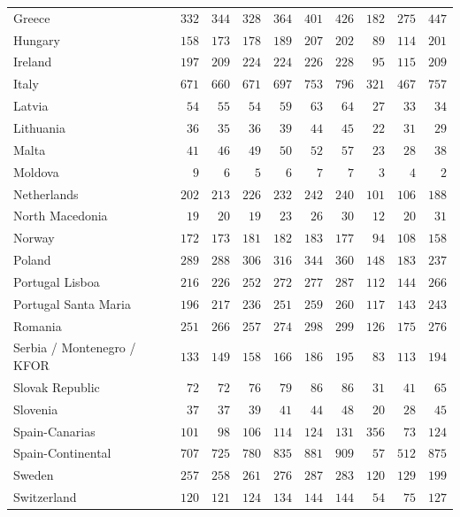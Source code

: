 \documentclass[
  11pt,
  a4paper,
]{book}
\begin{document}
\begin{longtable}{lrrrrrrrrr}
Greece & $332$ & $344$ & $328$ & $364$ & $401$ & $426$ & $182$ & $275$ & $447$ \\ 
Hungary & $158$ & $173$ & $178$ & $189$ & $207$ & $202$ & $89$ & $114$ & $201$ \\ 
Ireland & $197$ & $209$ & $224$ & $224$ & $226$ & $228$ & $95$ & $115$ & $209$ \\ 
Italy & $671$ & $660$ & $671$ & $697$ & $753$ & $796$ & $321$ & $467$ & $757$ \\ 
Latvia & $54$ & $55$ & $54$ & $59$ & $63$ & $64$ & $27$ & $33$ & $34$ \\ 
Lithuania & $36$ & $35$ & $36$ & $39$ & $44$ & $45$ & $22$ & $31$ & $29$ \\ 
Malta & $41$ & $46$ & $49$ & $50$ & $52$ & $57$ & $23$ & $28$ & $38$ \\ 
Moldova & $9$ & $6$ & $5$ & $6$ & $7$ & $7$ & $3$ & $4$ & $2$ \\ 
Netherlands & $202$ & $213$ & $226$ & $232$ & $242$ & $240$ & $101$ & $106$ & $188$ \\ 
North Macedonia & $19$ & $20$ & $19$ & $23$ & $26$ & $30$ & $12$ & $20$ & $31$ \\ 
Norway & $172$ & $173$ & $181$ & $182$ & $183$ & $177$ & $94$ & $108$ & $158$ \\ 
Poland & $289$ & $288$ & $306$ & $316$ & $344$ & $360$ & $148$ & $183$ & $237$ \\ 
Portugal Lisboa & $216$ & $226$ & $252$ & $272$ & $277$ & $287$ & $112$ & $144$ & $266$ \\ 
Portugal Santa Maria & $196$ & $217$ & $236$ & $251$ & $259$ & $260$ & $117$ & $143$ & $243$ \\ 
Romania & $251$ & $266$ & $257$ & $274$ & $298$ & $299$ & $126$ & $175$ & $276$ \\ 
Serbia / Montenegro / KFOR & $133$ & $149$ & $158$ & $166$ & $186$ & $195$ & $83$ & $113$ & $194$ \\ 
Slovak Republic & $72$ & $72$ & $76$ & $79$ & $86$ & $86$ & $31$ & $41$ & $65$ \\ 
Slovenia & $37$ & $37$ & $39$ & $41$ & $44$ & $48$ & $20$ & $28$ & $45$ \\ 
Spain-Canarias & $101$ & $98$ & $106$ & $114$ & $124$ & $131$ & $356$ & $73$ & $124$ \\ 
Spain-Continental & $707$ & $725$ & $780$ & $835$ & $881$ & $909$ & $57$ & $512$ & $875$ \\ 
Sweden & $257$ & $258$ & $261$ & $276$ & $287$ & $283$ & $120$ & $129$ & $199$ \\ 
Switzerland & $120$ & $121$ & $124$ & $134$ & $144$ & $144$ & $54$ & $75$ & $127$ \\ 

\end{longtable}
\end{document}
